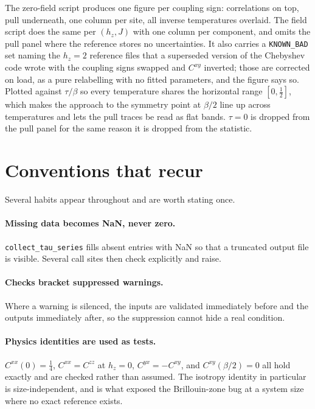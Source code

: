 \documentclass[11pt,a4paper]{article}
\newcommand{\code}[1]{\texttt{#1}}
\begin{document}
The zero-field script produces one figure per coupling sign: correlations on
top, pull underneath, one column per site, all inverse temperatures overlaid.
The field script does the same per $(h_z, J)$ with one column per component, and
omits the pull panel where the reference stores no uncertainties. It also
carries a \code{KNOWN\_BAD} set naming the $h_z=2$ reference files that a
superseded version of the Chebyshev code wrote with the coupling signs swapped
and $C^{xy}$ inverted; those are corrected on load, as a pure relabelling with
no fitted parameters, and the figure says so. Plotted against $\tau/\beta$
so every temperature shares the horizontal range $[0,\tfrac12]$, which makes the
approach to the symmetry point at $\beta/2$ line up across temperatures and lets
the pull traces be read as flat bands. $\tau=0$ is dropped from the pull panel
for the same reason it is dropped from the statistic.

\section{Conventions that recur}

Several habits appear throughout and are worth stating once.

\paragraph{Missing data becomes NaN, never zero.} \code{collect\_tau\_series}
fills absent entries with NaN so that a truncated output file is visible.
Several call sites then check explicitly and raise.

\paragraph{Checks bracket suppressed warnings.} Where a warning is silenced, the
inputs are validated immediately before and the outputs immediately after, so
the suppression cannot hide a real condition.

\paragraph{Physics identities are used as tests.} $C^{xx}(0)=\tfrac14$,
$C^{xx}=C^{zz}$ at $h_z=0$, $C^{yx}=-C^{xy}$, and $C^{xy}(\beta/2)=0$ all hold
exactly and are checked rather than assumed. The isotropy identity in particular
is size-independent, and is what exposed the Brillouin-zone bug at a system size
where no exact reference exists.
\end{document}
